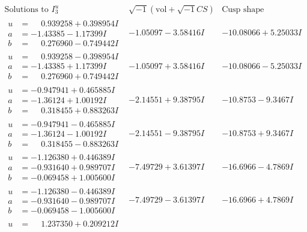 \documentclass[1p]{elsarticle_modified}
\theoremstyle{definition}
\newcommand{\I}{\sqrt{-1}}
\begin{document}
$$\begin{array}{c|c|c}  
\text{Solutions to }I^u_{3}& \I (\text{vol} + \sqrt{-1}CS) & \text{Cusp shape}\\
 \hline 
\begin{aligned}
u &= \phantom{-}0.939258 + 0.398954 I \\
a &= -1.43385 - 1.17399 I \\
b &= \phantom{-}0.276960 - 0.749442 I\end{aligned}
 & -1.05097 - 3.58416 I & -10.08066 + 5.25033 I \\ \hline\begin{aligned}
u &= \phantom{-}0.939258 - 0.398954 I \\
a &= -1.43385 + 1.17399 I \\
b &= \phantom{-}0.276960 + 0.749442 I\end{aligned}
 & -1.05097 + 3.58416 I & -10.08066 - 5.25033 I \\ \hline\begin{aligned}
u &= -0.947941 + 0.465885 I \\
a &= -1.36124 + 1.00192 I \\
b &= \phantom{-}0.318455 + 0.883263 I\end{aligned}
 & -2.14551 + 9.38795 I & -10.8753 - 9.3467 I \\ \hline\begin{aligned}
u &= -0.947941 - 0.465885 I \\
a &= -1.36124 - 1.00192 I \\
b &= \phantom{-}0.318455 - 0.883263 I\end{aligned}
 & -2.14551 - 9.38795 I & -10.8753 + 9.3467 I \\ \hline\begin{aligned}
u &= -1.126380 + 0.446389 I \\
a &= -0.931640 + 0.989707 I \\
b &= -0.069458 + 1.005600 I\end{aligned}
 & -7.49729 + 3.61397 I & -16.6966 - 4.7869 I \\ \hline\begin{aligned}
u &= -1.126380 - 0.446389 I \\
a &= -0.931640 - 0.989707 I \\
b &= -0.069458 - 1.005600 I\end{aligned}
 & -7.49729 - 3.61397 I & -16.6966 + 4.7869 I \\ \hline\begin{aligned}
u &= \phantom{-}1.237350 + 0.209212 I \\

\end{aligned}
\end{array}$$
\end{document}
